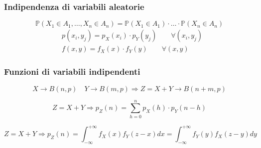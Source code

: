 \subsubsection{Indipendenza di variabili aleatorie}
\begin{definition}
	\begin{equation}
		\mathbb{P}(X_1 \in A_1, \ldots, X_n \in A_n) = \mathbb{P}(X_1 \in A_1) \cdot \ldots \cdot \mathbb{P}(X_n \in A_n)
	\end{equation}
	\begin{align}
		&p(x_i, y_j) = p_X(x_i) \cdot p_Y(y_j) \quad\quad \forall(x_i, y_j) \\
		& f(x,y) = f_X(x) \cdot f_Y(y) \quad\quad \forall (x,y)
	\end{align}
\end{definition}
\subsubsection{Funzioni di variabili indipendenti}
\begin{proposition}
	\begin{equation}
		X \to B(n,p) \quad Y \to B(m,p) \Longrightarrow Z=X+Y \to B(n+m, p)
	\end{equation}
\end{proposition}

\begin{proposition}
	\begin{equation}
		Z = X+Y \Longrightarrow p_Z(n) = \sum_{h=0}^{n}p_X(h) \cdot p_Y(n-h)
	\end{equation}
\end{proposition}

\begin{proposition}
	\begin{equation}
		Z = X+Y \Longrightarrow p_Z(n) = \int_{-\infty}^{+\infty} f_X(x)f_Y(z-x)dx = \int_{-\infty}^{+\infty} f_Y(y)f_X(z-y)dy
	\end{equation}
\end{proposition}

